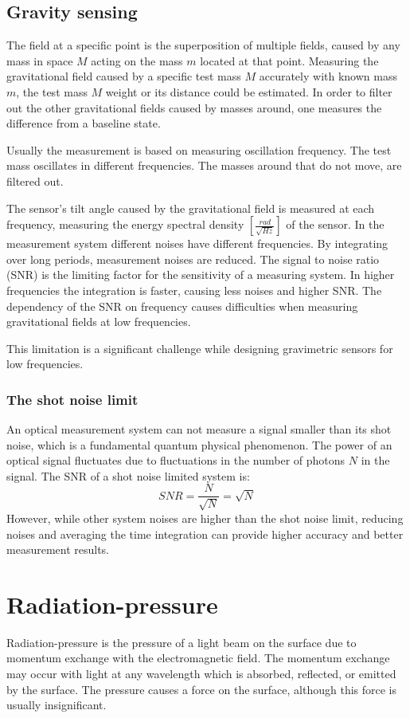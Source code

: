 \documentclass[\main/master.tex]{subfiles}
\begin{document}
\subsection{Gravity sensing}
The field at a specific point is the superposition of multiple fields, caused by any mass in space $M$ acting on the mass $m$ located at that point. Measuring the gravitational field caused by a specific test mass $M$ accurately with known mass $m$, the test mass $M$ weight or its distance could be estimated. In order to filter out the other gravitational fields caused by masses around, one measures the difference from a baseline state.
\par\noindent
Usually the measurement is based on measuring oscillation frequency. The test mass oscillates in different frequencies. The masses around that do not move, are filtered out.
\par\noindent
The sensor's tilt angle caused by the gravitational field is measured at each frequency, measuring the energy spectral density $[\frac{rad}{\sqrt{Hz}}]$ of the sensor.
In the measurement system different noises have different frequencies. By integrating over long periods, measurement noises are reduced. The signal to noise ratio (SNR) is the limiting factor for the sensitivity of a measuring system. In higher frequencies the integration is faster, causing less noises and higher SNR.
The dependency of the SNR on frequency causes difficulties when measuring gravitational fields at low frequencies.
\par\noindent
This limitation is a significant challenge while designing gravimetric sensors for low frequencies.

\subsubsection{The shot noise limit}
An optical measurement system can not measure a signal smaller than its shot noise, which is a fundamental quantum physical phenomenon. The power of an optical signal fluctuates due to fluctuations in the number of photons $N$ in the signal. The SNR of a shot noise limited system is:
\begin{equation}
SNR = \frac{N}{\sqrt{N}} = \sqrt{N}    \label{eqn:shot_noise}
\end{equation}
However, while other system noises are higher than the shot noise limit, reducing noises and averaging the time integration can provide higher accuracy and better measurement results. 

\section{Radiation-pressure}
Radiation-pressure is the pressure of a light beam on the surface due to momentum exchange with the electromagnetic field. The momentum exchange may occur with light at any wavelength which is absorbed, reflected, or emitted by the surface. The pressure causes a force on the surface, although this force is usually insignificant.
  
\end{document}
